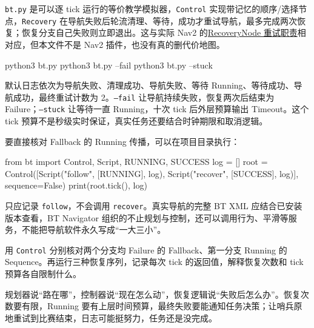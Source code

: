 \begin{example}
\texttt{bt.py} 是可以逐 tick 运行的等价教学模拟器，\texttt{Control} 实现带记忆的顺序/选择节点，\texttt{Recovery} 在导航失败后轮流清理、等待，成功才重试导航，最多完成两次恢复；恢复分支自己失败则立即退出。这与实际 Nav2 的\href{https://docs.nav2.org/rolling/configuration_and_development/configuration_guide/core_servers/bt_plugins/controls/RecoveryNode/}{RecoveryNode 重试职责}相对应，但本文件不是 Nav2 插件，也没有真的删代价地图。


\begin{tbash}
python3 bt.py
python3 bt.py --fail
python3 bt.py --stuck
\end{tbash}
默认日志依次为导航失败、清理成功、导航失败、等待 Running、等待成功、导航成功，最终重试计数为 2。\texttt{--fail} 让导航持续失败，恢复两次后结束为 Failure；\texttt{--stuck} 让等待一直 Running，十次 tick 后外层预算输出 Timeout。这个 tick 预算不是秒级实时保证，真实任务还要结合时钟期限和取消逻辑。

要直接核对 Fallback 的 Running 传播，可以在项目目录执行：
\begin{tpython}
from bt import Control, Script, RUNNING, SUCCESS
log = []
root = Control([Script("follow", [RUNNING], log),
                Script("recover", [SUCCESS], log)], sequence=False)
print(root.tick(), log)
\end{tpython}
只应记录 \texttt{follow}，不会调用 \texttt{recover}。真实导航的完整 BT XML 应结合已安装版本查看，BT Navigator 组织的不止规划与控制，还可以调用行为、平滑等服务，不能把导航软件永久写成“一大三小”。
\end{example}
\begin{exercise}\label{ex:nav-bt}
用 \texttt{Control} 分别核对两个分支均 Failure 的 Fallback、第一分支 Running 的 Sequence。再运行三种恢复序列，记录每次 tick 的返回值，解释恢复次数和 tick 预算各自限制什么。
\end{exercise}
\begin{conclusion}
规划器说“路在哪”，控制器说“现在怎么动”，恢复逻辑说“失败后怎么办”。恢复次数要有限，Running 要有上层时间预算，最终失败要能通知任务决策；让哨兵原地重试到比赛结束，日志可能挺努力，任务还是没完成。
\end{conclusion}
